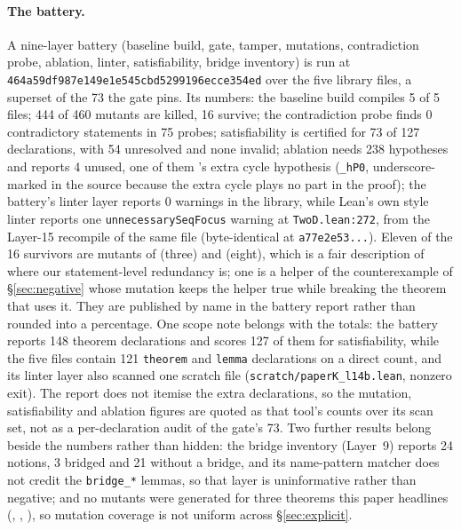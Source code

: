 \documentclass[11pt]{article}
\theoremstyle{definition}
\theoremstyle{remark}
\newcommand{\pkcommit}{464a59df987e149e1e545cbd5299196ecce354ed}
\begin{document}
\paragraph{The battery.} A nine-layer battery (baseline build, gate, tamper, mutations,
contradiction probe, ablation, linter, satisfiability, bridge inventory) is run at \texttt{\pkcommit}
over the five library files, a superset of the 73 the gate pins. Its numbers: the baseline build compiles 5
of 5 files; 444 of 460 mutants are killed, 16 survive; the contradiction probe finds 0 contradictory
statements in 75 probes; satisfiability is certified for 73 of 127 declarations, with 54 unresolved
and none invalid; ablation needs 238 hypotheses and reports 4 unused, one of them
's extra cycle hypothesis (\texttt{\_hP0}, underscore-marked in the source
because the extra cycle plays no part in the proof); the battery's linter layer reports 0 warnings in
the library, while Lean's own style linter reports one \texttt{unnecessarySeqFocus} warning at
\texttt{TwoD.lean:272}, from the Layer-15 recompile of the same file (byte-identical at
\texttt{a77e2e53...}). Eleven of the 16 survivors are mutants of
 (three) and  (eight),
which is a fair description of where our statement-level redundancy is; one is a helper of the
counterexample of \S\ref{sec:negative} whose mutation keeps the helper true while breaking the
theorem that uses it. They are published by name in the battery report rather than rounded into a
percentage. One scope note belongs with the totals: the battery reports 148 theorem declarations and
scores 127 of them for satisfiability, while the five files contain 121 \texttt{theorem} and
\texttt{lemma} declarations on a direct count, and its linter layer also scanned one scratch file
(\texttt{scratch/paperK\_l14b.lean}, nonzero exit). The report does not itemise the extra
declarations, so the mutation, satisfiability and ablation figures are quoted as that tool's counts
over its scan set, not as a per-declaration audit of the gate's 73. Two further results belong beside
the numbers rather than hidden: the bridge inventory
(Layer~9) reports 24 notions, 3 bridged and 21 without a bridge, and its name-pattern matcher does
not credit the \texttt{bridge\_*} lemmas, so that layer is uninformative rather than negative; and no
mutants were generated for three theorems this paper headlines
(, ,
), so mutation coverage is not uniform across \S\ref{sec:explicit}.
\end{document}

